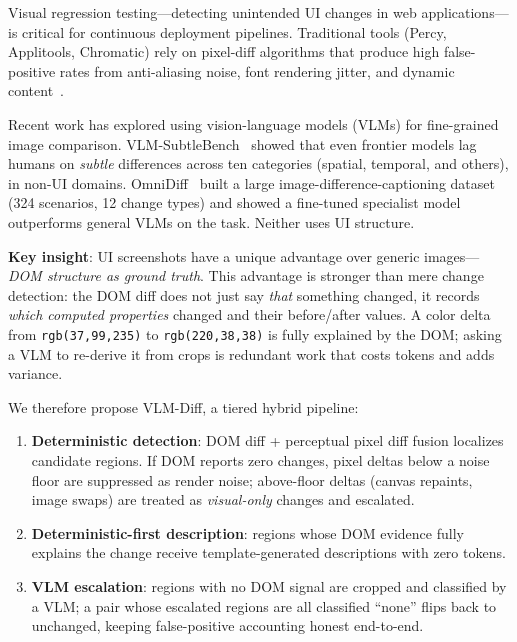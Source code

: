 \documentclass[10pt,twocolumn,letterpaper]{article}
\begin{document}
Visual regression testing—detecting unintended UI changes in web applications—is critical for continuous deployment pipelines. Traditional tools (Percy, Applitools, Chromatic) rely on pixel-diff algorithms that produce high false-positive rates from anti-aliasing noise, font rendering jitter, and dynamic content~\cite{applitools2026}.

Recent work has explored using vision-language models (VLMs) for fine-grained image comparison. VLM-SubtleBench~\cite{vlmsubtlebench2026} showed that even frontier models lag humans on \textit{subtle} differences across ten categories (spatial, temporal, and others), in non-UI domains. OmniDiff~\cite{omnidiff2026} built a large image-difference-captioning dataset (324 scenarios, 12 change types) and showed a fine-tuned specialist model outperforms general VLMs on the task. Neither uses UI structure.

\textbf{Key insight}: UI screenshots have a unique advantage over generic images—\textit{DOM structure as ground truth}. This advantage is stronger than mere change detection: the DOM diff does not just say \textit{that} something changed, it records \textit{which computed properties} changed and their before/after values. A color delta from \texttt{rgb(37,99,235)} to \texttt{rgb(220,38,38)} is fully explained by the DOM; asking a VLM to re-derive it from crops is redundant work that costs tokens and adds variance.

We therefore propose VLM-Diff, a tiered hybrid pipeline:
\begin{enumerate}
\item \textbf{Deterministic detection}: DOM diff + perceptual pixel diff fusion localizes candidate regions. If DOM reports zero changes, pixel deltas below a noise floor are suppressed as render noise; above-floor deltas (canvas repaints, image swaps) are treated as \textit{visual-only} changes and escalated.
\item \textbf{Deterministic-first description}: regions whose DOM evidence fully explains the change receive template-generated descriptions with zero tokens.
\item \textbf{VLM escalation}: regions with no DOM signal are cropped and classified by a VLM; a pair whose escalated regions are all classified ``none'' flips back to unchanged, keeping false-positive accounting honest end-to-end.
\end{enumerate}
\end{document}
